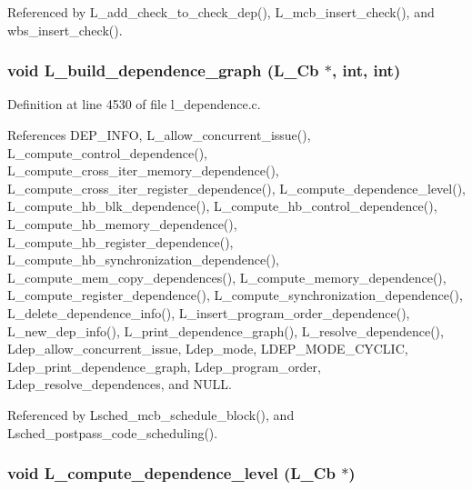 Referenced by L\_\-add\_\-check\_\-to\_\-check\_\-dep(), L\_\-mcb\_\-insert\_\-check(), and wbs\_\-insert\_\-check().
\subsubsection{\setlength{\rightskip}{0pt plus 5cm}void L\_\-build\_\-dependence\_\-graph (L\_\-Cb $\ast$, int, int)}\label{l__dependence_8h_0bbba3ce0e64cc507c81ba677b2b6b03}




Definition at line 4530 of file l\_\-dependence.c.

References DEP\_\-INFO, L\_\-allow\_\-concurrent\_\-issue(), L\_\-compute\_\-control\_\-dependence(), L\_\-compute\_\-cross\_\-iter\_\-memory\_\-dependence(), L\_\-compute\_\-cross\_\-iter\_\-register\_\-dependence(), L\_\-compute\_\-dependence\_\-level(), L\_\-compute\_\-hb\_\-blk\_\-dependence(), L\_\-compute\_\-hb\_\-control\_\-dependence(), L\_\-compute\_\-hb\_\-memory\_\-dependence(), L\_\-compute\_\-hb\_\-register\_\-dependence(), L\_\-compute\_\-hb\_\-synchronization\_\-dependence(), L\_\-compute\_\-mem\_\-copy\_\-dependences(), L\_\-compute\_\-memory\_\-dependence(), L\_\-compute\_\-register\_\-dependence(), L\_\-compute\_\-synchronization\_\-dependence(), L\_\-delete\_\-dependence\_\-info(), L\_\-insert\_\-program\_\-order\_\-dependence(), L\_\-new\_\-dep\_\-info(), L\_\-print\_\-dependence\_\-graph(), L\_\-resolve\_\-dependence(), Ldep\_\-allow\_\-concurrent\_\-issue, Ldep\_\-mode, LDEP\_\-MODE\_\-CYCLIC, Ldep\_\-print\_\-dependence\_\-graph, Ldep\_\-program\_\-order, Ldep\_\-resolve\_\-dependences, and NULL.

Referenced by Lsched\_\-mcb\_\-schedule\_\-block(), and Lsched\_\-postpass\_\-code\_\-scheduling().
\subsubsection{\setlength{\rightskip}{0pt plus 5cm}void L\_\-compute\_\-dependence\_\-level (L\_\-Cb $\ast$)}\label{l__dependence_8h_cfe711d4aba7e4c8980897955204029f}




